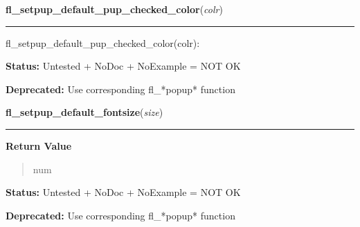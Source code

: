     \label{xformslib:deprecated:fl_setpup_default_pup_checked_color}

    \vspace{0.5ex}

\hspace{.8\funcindent}\begin{boxedminipage}{\funcwidth}

    \raggedright \textbf{fl\_setpup\_default\_pup\_checked\_color}(\textit{colr})

    \vspace{-1.5ex}

    \rule{\textwidth}{0.5\fboxrule}
\setlength{\parskip}{2ex}
    fl\_setpup\_default\_pup\_checked\_color(colr):

\setlength{\parskip}{1ex}
\textbf{Status:} Untested + NoDoc + NoExample = NOT OK



\textbf{Deprecated:} Use corresponding fl\_*popup* function



    \end{boxedminipage}

    \label{xformslib:deprecated:fl_setpup_default_fontsize}

    \vspace{0.5ex}

\hspace{.8\funcindent}\begin{boxedminipage}{\funcwidth}

    \raggedright \textbf{fl\_setpup\_default\_fontsize}(\textit{size})

    \vspace{-1.5ex}

    \rule{\textwidth}{0.5\fboxrule}
\setlength{\parskip}{2ex}
\setlength{\parskip}{1ex}
      \textbf{Return Value}
    \vspace{-1ex}

      \begin{quote}
      num

      \end{quote}

\textbf{Status:} Untested + NoDoc + NoExample = NOT OK



\textbf{Deprecated:} Use corresponding fl\_*popup* function



    \end{boxedminipage}

